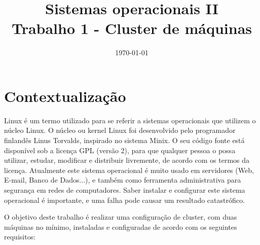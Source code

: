 \documentclass[
	12pt,				%
	openany,			%
	a4paper,			%
	chapter=TITLE,		%
	section=TITLE,		%
	english,
	brazil				%
]{abntex2}
\title{Sistemas operacionais II \\ Trabalho 1 - Cluster de máquinas}
\date{\today}
\begin{document}
\maketitle

\newpage
\tableofcontents
\newpage
\listoffigures
\newpage
\listoftables

\chapter{Contextualização}

Linux é um termo utilizado para se referir a sistemas operacionais que utilizem o núcleo Linux. O núcleo ou kernel Linux foi desenvolvido pelo programador finlandês Linus Torvalds, inspirado no sistema Minix. O seu código fonte está disponível sob a licença GPL (versão 2), para que qualquer pessoa o possa utilizar, estudar, modificar e distribuir livremente, de acordo com os termos da licença. Atualmente este sistema operacional é muito usado em servidores (Web, E-mail, Banco de Dados...), e também como ferramenta administrativa para segurança em redes de computadores. Saber instalar e configurar este sistema operacional é importante, e uma falha pode causar um resultado catastrófico.

O objetivo deste trabalho é realizar uma configuração de cluster, com duas máquinas no mínimo, instaladas e configuradas de acordo com os seguintes requisitos:
\end{document}
